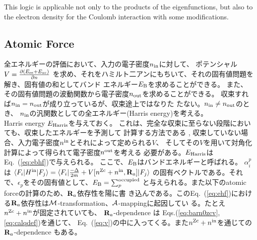 \documentclass[twocolumn,showpacs,preprintnumbers,amsmath,amssymb,floatfix]{revtex4-1}
\newcommand{\bfR}{{\bf R}}
\def\calR{{\cal A}}
\newcommand{\req}[1]{\mbox{Eq.~\!(\ref{#1})}}
\def\nzc{n^{\rm Zc}}
\def\MM{{\cal M}}
\def\ehf{E_{\rm Harris}}
\def\nin{n^{\rm in}}
\def\nout{n^{\rm out}}
\begin{document}
This logic is applicable not only to the products of the eigenfunctions, 
but also to the electron density for the Coulomb interaction 
with some modifications.



\begin{widetext}
\section{Atomic Force}
\label{sec:force}
全エネルギーの評価において、入力の電子密度$n_{\rm in}$に対して、
ポテンシャル$V=\frac{\partial (E_{\rm es} + E_{\rm xc})}{\partial n}$
を求め、それをハミルト二アンにもちいて、それの固有値問題を解き、固有値の和としてバンド
エネルギー$E_{\rm B}$を求めることができる。
また、その固有値問題の波動関数から電子密度$n_{\rm out}$を求めることができる。
収束すれば$n_{\rm in}=n_{\rm out}$が成り立っているが、収束途上ではなりた
たない。$n_{\rm in}\ne n_{\rm out}$のとき、
$n_{\rm in}$の汎関数としての全エネルギー(Harris energy)を考える。\\

Harris energy $\ehf$を与えておく。
これは、完全な収束に至らない段階においても、収束したエネルギーを予測して
計算する方法である \cite{molforce,harris85},
収束していない場合、入力電子密度$\nin$とそれによって定められる$V$、
そしてその$V$を用いて対角化計算によって得られて電子密度$\nout$を考える
必要がある。$\ehf$は\req{eq:ebhf}で与えられる。
ここで、$E_{\rm B}$はバンドエネルギーと呼ばれる。
$\alpha_i^p$は
$\langle F_i|H^{\rm in}|F_j \rangle=
\langle F_i| \frac{-\Delta}{2m} + V[\nzc+\nin,\bfR_a] |F_j\rangle$
の固有ベクトルである。それで、$\epsilon_p$をその固有値として、$E_{\rm B}=\sum^{\rm occupied}_p$
と与えられる。また以下のatomic forceの計算のため、$\bfR_a$依存性を陽に書
き込んである。この\req{eq:ehf}における$\bfR_a$依存性は$\MM$-transformation、$\calR$-mappingに起因してい
る。たとえ$\nzc+\nin$が固定されていても、
$\bfR_a$-dependence は Eqs.(\ref{eq:barn0zcv},\ref{eq:calqdef})を通じて、
\req{eq:v}の中に入ってくる。また$\nzc+\nin$を通じての$\bfR_a$-dependence
もある。


\end{widetext}
\end{document}
